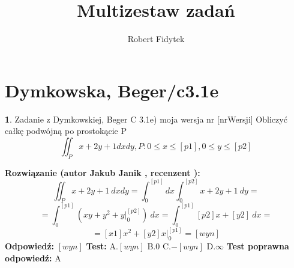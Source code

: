 \documentclass[12pt, a4paper]{article}
\title{Multizestaw zadań}
\author{Robert Fidytek}
\date{}
\theoremstyle{definition} %
\newtheorem{zad}{}
\newcommand{\kategoria}[1]{\section{#1}} %
\newcommand{\zadStart}[1]{\begin{zad}#1\newline} %
\newcommand{\zadStop}{\end{zad}}   %
\newcommand{\rozwStart}[2]{\noindent \textbf{Rozwiązanie (autor #1 , recenzent #2): }\newline} %
\newcommand{\rozwStop}{\newline}                                            %
\newcommand{\odpStart}{\noindent \textbf{Odpowiedź:}\newline}    %
\newcommand{\odpStop}{\newline}                                             %
\newcommand{\testStart}{\noindent \textbf{Test:}\newline} %
\newcommand{\testStop}{\newline} %
\newcommand{\kluczStart}{\noindent \textbf{Test poprawna odpowiedź:}\newline} %
\newcommand{\kluczStop}{\newline} %
\begin{document}
\maketitle


\kategoria{Dymkowska, Beger/c3.1e}
\zadStart{Zadanie z Dymkowskiej, Beger C 3.1e) moja wersja nr [nrWersji]}
Obliczyć całkę podwójną po prostokącie P $$\iint_P x+2y+1 dxdy, P: 0\leq x \leq [p1], 0 \leq y \leq [p2]$$
\zadStop
\rozwStart{Jakub Janik}{}
$$\iint_P x+2y+1\ dxdy=\int_0^{[p1]}dx\int_0^{[p2]}x+2y+1\ dy=$$
$$=\int_0^{[p1]}(xy+y^2+y\Big|_0^{[p2]})\ dx=\int_0^{[p1]}[p2]x+[y2]\ dx=$$
$$=[x1]x^2+[y2]x\Big|_0^{[p1]}=[wyn]$$
\rozwStop
\odpStart
$[wyn]$
\odpStop
\testStart
A.$[wyn]$
B.$0$
C.$-[wyn]$
D.$\infty$
\testStop
\kluczStart
A
\kluczStop
\end{document}
